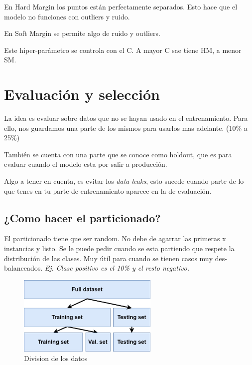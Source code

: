 \documentclass[titlepage,a4paper]{article}
\begin{document}
En Hard Margin los puntos están perfectamente separados. Esto hace que el modelo no funciones con outliers y ruido.

En Soft Margin se permite algo de ruido y outliers.

Este hiper-parámetro se controla con el C. A mayor C sae tiene HM, a menor SM.



\section{Evaluación y selección}

La idea es evaluar sobre datos que no se hayan usado en el entrenamiento. Para ello, nos guardamos una parte de los mismos para usarlos mas adelante. (10\% a 25\%)

También se cuenta con una parte que se conoce como holdout, que es para evaluar cuando el modelo esta por salir a producción.

Algo a tener en cuenta, es evitar los \textit{data leaks}, esto sucede cuando parte de lo que tenes en tu parte de entrenamiento aparece en la de evaluación.

\subsection{¿Como hacer el particionado?}

El particionado tiene que ser random. No debe de agarrar las primeras x instancias y listo. Se le puede pedir cuando se esta partiendo que respete la distribución de las clases. Muy útil para cuando se tienen casos muy des-balanceados. \textit{Ej. Clase positivo es el 10\% y el resto negativo.}

\begin{figure}[!htb]
    \centering
    \includegraphics[width=0.6\textwidth]{imagenesResumen/TrainTestSplit.jpg}
    \caption{Division de los datos}
\end{figure}
\end{document}
